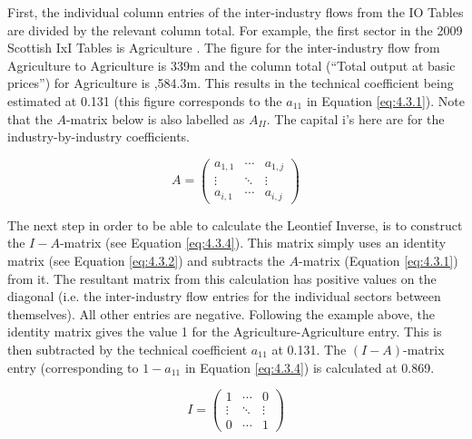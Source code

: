 \begin{doublespacing}
\bigskip

First, the individual column entries of the inter-industry flows from the IO Tables are divided by the relevant column total. For example, the first sector in the 2009 Scottish IxI Tables is Agriculture \cite{ScottishGovernment2013a}. The figure for the inter-industry flow from Agriculture to Agriculture is \textsterling339m and the column total (``Total output at basic prices'') for Agriculture is ,584.3m. This results in the technical coefficient being estimated at 0.131 (this figure corresponds to the $a_{11}$ in Equation \ref{eq:4.3.1}). Note that the $\textit{A}$-matrix below is also labelled as $A_{II}$. The capital i's here are for the industry-by-industry coefficients.

  \bigskip
\begin{singlespacing}
 \begin{equation} \label{eq:4.3.1}
  A = \begin{pmatrix}
  a_{1,1} & \cdots & a_{1,j} \\
  \vdots & \ddots & \vdots  \\
  a_{i,1} & \cdots & a_{i,j}
  \end{pmatrix} \end{equation} 
  \end{singlespacing} \bigskip

The next step in order to be able to calculate the Leontief Inverse, is to construct the $I-\textit{A}$-matrix (see Equation \ref{eq:4.3.4}). This matrix simply uses an identity matrix (see Equation \ref{eq:4.3.2}) and subtracts the $\textit{A}$-matrix (Equation \ref{eq:4.3.1}) from it. The resultant matrix from this calculation has positive values on the diagonal (i.e. the inter-industry flow entries for the individual sectors between themselves). All other entries are negative. Following the example above, the identity matrix gives the value 1 for the Agriculture-Agriculture entry. This is then subtracted by the technical coefficient $a_{11}$  at 0.131. The $(I-A)$-matrix entry (corresponding to $1-a_{11}$ in Equation \ref{eq:4.3.4}) is calculated at 0.869.

  \bigskip \begin{singlespacing} \begin{equation} \label{eq:4.3.2}
  I = \begin{pmatrix}
    1 & \cdots & 0 \\
    \vdots & \ddots & \vdots  \\
    0 & \cdots & 1
  \end{pmatrix} \end{equation} \end{singlespacing} 


\end{doublespacing}
